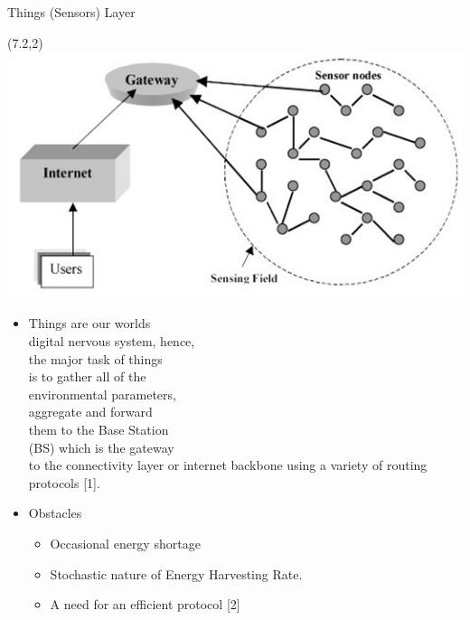 \documentclass{beamer}
\begin{document}
\begin{frame}[t]{Things (Sensors) Layer} %

\begin{textblock}{0.5}(7.2,2)
\includegraphics[scale=0.5]{figure/Things.png}
\end{textblock}

\begin{itemize}
\justifying
\footnotesize
\item Things are our worlds \\ digital nervous system, hence, \\ the major task of things \\ is to gather all of the \\ environmental parameters, \\ aggregate and forward \\ them to the Base Station \\ (BS) which is the gateway \\ to the connectivity layer or internet backbone using a variety of routing protocols [1].

\item Obstacles

\begin{itemize}

\footnotesize

\item Occasional energy shortage

\item Stochastic nature of Energy Harvesting Rate.

\item A need for an efficient protocol [2]


\end{itemize}
\end{itemize}
\end{frame}
\end{document}
